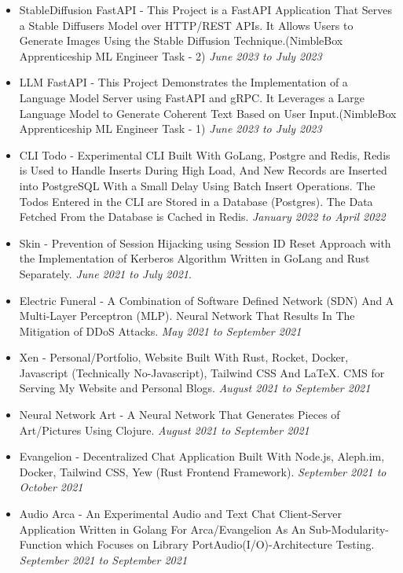 \documentclass{myresume}
\begin{document}
       \begin{itemize}
       	\item StableDiffusion FastAPI - This Project is a FastAPI Application That Serves a Stable Diffusers Model over HTTP/REST APIs. It Allows Users to Generate Images Using the Stable Diffusion Technique.(NimbleBox Apprenticeship ML Engineer Task - 2) \textit {June 2023 to July 2023} 
       	\item LLM FastAPI - This Project Demonstrates the Implementation of a Language Model Server using FastAPI and gRPC. It Leverages a Large Language Model to Generate Coherent Text Based on User Input.(NimbleBox Apprenticeship ML Engineer Task - 1) \textit {June 2023 to July 2023}
       	\item CLI Todo -  Experimental CLI Built With GoLang, Postgre and Redis, Redis is Used to Handle Inserts During High Load, And New Records are Inserted into PostgreSQL With a Small Delay Using Batch Insert Operations. The Todos Entered in the CLI are Stored in a Database (Postgres). The Data Fetched From the Database is Cached in Redis. \textit{January 2022 to April 2022}
       	\item Skin - Prevention of Session Hijacking using Session ID Reset Approach with the Implementation of Kerberos Algorithm Written in GoLang and Rust Separately. \textit{June 2021 to July 2021}.
     	\item Electric Funeral - A Combination of Software Defined Network (SDN) And A Multi-Layer Perceptron (MLP). Neural Network That Results In The Mitigation of DDoS Attacks. \textit{May 2021 to September 2021}
     	\item Xen - Personal/Portfolio, Website Built With Rust, Rocket, Docker, Javascript (Technically No-Javascript), Tailwind CSS And \LaTeX{}. CMS for Serving My Website and Personal Blogs. 
     	\textit{August 2021 to September 2021}
     	\item Neural Network Art -  A Neural Network That Generates Pieces of Art/Pictures Using Clojure. \textit{August 2021 to September 2021}
     	\item Evangelion - Decentralized Chat Application Built With Node.js, Aleph.im, Docker, Tailwind CSS, Yew (Rust Frontend Framework). \textit{September 2021 to October 2021}
     	\item Audio Arca - An Experimental Audio and Text Chat Client-Server Application Written in Golang For Arca/Evangelion As An Sub-Modularity-Function which Focuses on Library PortAudio(I/O)-Architecture Testing. \textit{September 2021 to September 2021}

\end{itemize}
\end{document}
